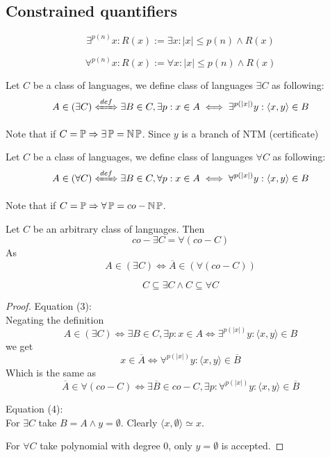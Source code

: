 \subsection{Constrained quantifiers}
\begin{definition}
	\[ \exists^{p(n)} x: R(x) := \exists x: |x| \leq p(n) \land R(x) \]
\end{definition}
\begin{definition}
	\[ \forall^{p(n)} x: R(x) := \forall x: |x| \leq p(n) \land R(x) \]
\end{definition}

\begin{definition}
	Let $C$ be a class of languages, we define class of languages $\exists C$ as following:
	\[ A \in (\exists C) \xLeftrightarrow{def} \exists B \in C, \exists p: x \in A \iff \exists^{p(|x|)} y: \langle x, y \rangle \in B \]

	Note that if $C = \operatorname{\mathbb{P}} \Rightarrow \exists \operatorname{\mathbb{P}} = \operatorname{\operatorname{\mathbb{N}}\mathbb{P}} $.
	Since $y$ is a branch of NTM (certificate)
\end{definition}

\begin{definition}
	Let $C$ be a class of languages, we define class of languages $\forall C$ as following:
	\[ A \in (\forall C) \xLeftrightarrow{def} \exists B \in C, \forall p: x \in A \iff \forall^{p(|x|)} y: \langle x, y \rangle \in B \]

	Note that if $C = \operatorname{\mathbb{P}} \Rightarrow \forall \operatorname{\mathbb{P}} = co-\operatorname{\operatorname{\mathbb{N}}\mathbb{P}} $.
\end{definition}

\begin{lemma}\label{quant_class_rel}
	Let $C$ be an arbitrary class of languages. Then
	\begin{equation}
		co-\exists C = \forall(co-C)
	\end{equation}
	As
	\[ A \in (\exists C) \iff \overline{A} \in (\forall(co-C)) \]

	\begin{equation}
		C \subseteq \exists C \land C \subseteq \forall C
	\end{equation}
\end{lemma}
\begin{proof}
	Equation (3): \\
	Negating the definition
	\[ A \in (\exists C) \iff \exists B \in C, \exists p: x \in A \iff \exists^{p(|x|)} y: \langle x, y \rangle \in B \]
	we get
	\[ x \in \overline{A} \iff \forall^{p(|x|)} y: \langle x, y \rangle \in \overline{B} \]
	Which is the same as
	\[ \overline{A} \in \forall (co-C) \iff \exists \overline{B} \in co-C, \exists p: \forall^{p(|x|)} y: \langle x, y \rangle \in \overline{B} \]

	Equation (4): \\
	For $\exists C$ take $B = A \land y = \emptyset$.
	Clearly $\langle x, \emptyset \rangle \simeq x$.

	For $\forall C$ take polynomial with degree 0, only $y = \emptyset$ is accepted.
\end{proof}

